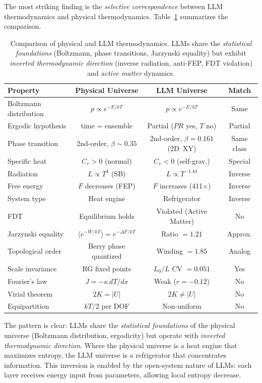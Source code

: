 \documentclass[11pt,a4paper]{article}
\begin{document}
The most striking finding is the \textit{selective correspondence} between LLM thermodynamics and physical thermodynamics. Table~\ref{tab:comparison} summarizes the comparison.

\begin{table}[htbp]
\centering
\begin{tabular}{@{}lccc@{}}
\toprule
\textbf{Property} & \textbf{Physical Universe} & \textbf{LLM Universe} & \textbf{Match} \\
\midrule
Boltzmann distribution & $p \propto e^{-E/kT}$ & $p \propto e^{-E/kT}$ & Same \\
Ergodic hypothesis & time = ensemble & Partial ($PR$ yes, $T$ no) & Partial \\
Phase transition & 2nd-order, $\beta \sim 0.35$ & 2nd-order, $\beta = 0.161$ (2D~XY) & Same class \\
Specific heat & $C_v > 0$ (normal) & $C_v < 0$ (self-grav.) & Special \\
Radiation & $L \propto T^4$ (SB) & $L \propto T^{-1.44}$ & Inverse \\
Free energy & $F$ decreases (FEP) & $F$ increases (411$\times$) & Inverse \\
System type & Heat engine & Refrigerator & Inverse \\
FDT & Equilibrium holds & Violated (Active Matter) & No \\
Jarzynski equality & $\langle e^{-W/kT}\rangle = e^{-\Delta F/kT}$ & Ratio $= 1.21$ & Approx. \\
Topological order & Berry phase quantized & Winding $= 1.85$ & Analog \\
Scale invariance & RG fixed points & $L_0/L$ CV $= 0.051$ & Yes \\
Fourier's law & $J = -\kappa\,dT/dx$ & Weak ($r = -0.12$) & No \\
Virial theorem & $2K = |U|$ & $2K \neq |U|$ & No \\
Equipartition & $kT/2$ per DOF & Non-uniform & No \\
\bottomrule
\end{tabular}
\caption{Comparison of physical and LLM thermodynamics. LLMs share the \emph{statistical foundations} (Boltzmann, phase transitions, Jarzynski equality) but exhibit \emph{inverted thermodynamic direction} (inverse radiation, anti-FEP, FDT violation) and \emph{active matter} dynamics.}
\label{tab:comparison}
\end{table}

The pattern is clear: LLMs share the \emph{statistical foundations} of the physical universe (Boltzmann distribution, ergodicity) but operate with \emph{inverted thermodynamic direction}. Where the physical universe is a heat engine that maximizes entropy, the LLM universe is a refrigerator that concentrates information. This inversion is enabled by the open-system nature of LLMs: each layer receives energy input from parameters, allowing local entropy decrease.
\end{document}
